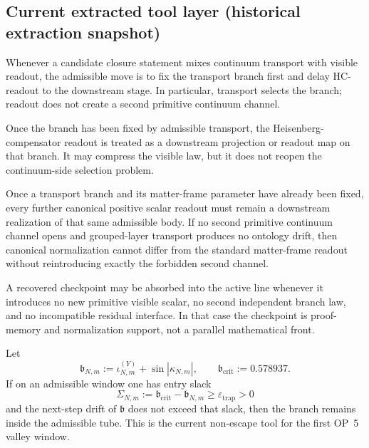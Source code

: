 \subsection*{Current extracted tool layer (historical extraction snapshot)}
\begin{description}[leftmargin=2.2em, labelindent=0pt, itemsep=0.5em]
  \item[Transport-first tool.] Whenever a candidate closure statement mixes continuum transport with visible readout, the admissible move is to fix the transport branch first and delay HC-readout to the downstream stage. In particular, transport selects the branch; readout does not create a second primitive continuum channel.
  \item[Readout-after-transport tool.] Once the branch has been fixed by admissible transport, the Heisenberg-compensator readout is treated as a downstream projection or readout map on that branch. It may compress the visible law, but it does not reopen the continuum-side selection problem.
  \item[Admissible-readout uniqueness tool.] Once a transport branch and its matter-frame parameter have already been fixed, every further canonical positive scalar readout must remain a downstream realization of that same admissible body. If no second primitive continuum channel opens and grouped-layer transport produces no ontology drift, then canonical normalization cannot differ from the standard matter-frame readout without reintroducing exactly the forbidden second channel.
  \item[Checkpoint-absorption tool.] A recovered checkpoint may be absorbed into the active line whenever it introduces no new primitive visible scalar, no second independent branch law, and no incompatible residual interface. In that case the checkpoint is proof-memory and normalization support, not a parallel mathematical front.
  \item[Epsilon-trap tool.] Let
  \[
    \mathfrak b_{N,m}:=\iota^{(Y)}_{N,m}+\sin|\kappa_{N,m}|,
    \qquad
    \mathfrak b_{\mathrm{crit}}:=0.578937.
  \]
  If on an admissible window one has entry slack
  \[
    \Sigma_{N,m}:=\mathfrak b_{\mathrm{crit}}-\mathfrak b_{N,m}\ge \varepsilon_{\mathrm{trap}}>0
  \]
  and the next-step drift of \(\mathfrak b\) does not exceed that slack, then the branch remains inside the admissible tube. This is the current non-escape tool for the first OP~5 valley window.


\end{description}

